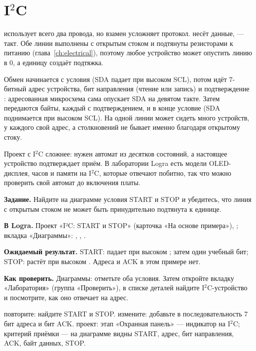 \section{I$^2$C}

 использует всего два провода, но взамен усложняет протокол.
 несёт данные,  --- такт. Обе линии выполнены с открытым
стоком и подтянуты резисторами к питанию (глава~\ref{ch:electrical}), поэтому
любое устройство может опустить линию в 0, а единицу создаёт подтяжка.

Обмен начинается с условия  (SDA падает при высоком SCL), потом
идёт 7-битный адрес устройства, бит направления (чтение или запись) и
подтверждение : адресованная микросхема сама опускает SDA на
девятом такте. Затем передаются байты, каждый с подтверждением, и в конце
условие  (SDA поднимается при высоком SCL). На одной линии может сидеть
много устройств, у каждого свой адрес, а столкновений не бывает именно
благодаря открытому стоку.

Проект с I$^2$C сложнее: нужен автомат из десятков состояний, а настоящее
устройство подтверждает приём. В лаборатории Logra есть модели OLED-дисплея,
часов и памяти на I$^2$C, которые отвечают побитно, так что можно проверить
свой автомат до включения платы.

\begin{diybox}
\textbf{Задание.} Найдите на диаграмме условия START и STOP и убедитесь, что линия с открытым стоком не может быть принудительно подтянута к единице.

\textbf{В Logra.} Проект «I²C: START и STOP» (карточка «На основе примера»), ; вкладка «Диаграммы»: , , .

\textbf{Ожидаемый результат.} START:  падает при высоком ; затем один учебный бит; STOP:  растёт при высоком . Адреса и ACK в этом примере нет.

\textbf{Как проверить.} Диаграммы: отметьте оба условия. Затем откройте вкладку «Лаборатория» (группа «Проверить»), в списке деталей найдите I$^2$C-устройство и посмотрите, как оно отвечает на адрес.

 повторите: найдите START и STOP.  измените: добавьте в последовательность 7 бит адреса и бит ACK.  проект: этап «Охранная панель» --- индикатор на I$^2$C; критерий приёмки --- на диаграмме видны START, адрес, бит направления, ACK, байт данных, STOP.
\end{diybox}

